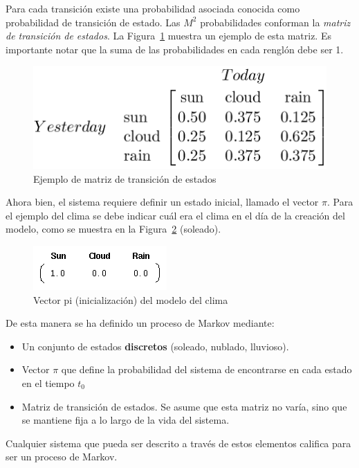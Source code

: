 \documentclass{article}
\begin{document}
Para cada transición existe una probabilidad asociada conocida como probabilidad de transición de estado.
Las $M^2$ probabilidades conforman la \emph{matriz de transición de estados}.
La Figura~\ref{fig:matriz-transicion-clima} muestra un ejemplo de esta matriz.
Es importante notar que la suma de las probabilidades en cada renglón debe ser 1.
\begin{figure}[h]
	\centering
	\includegraphics[scale=0.6]{resources/images/weather-matrix}
	\caption{Ejemplo de matriz de transición de estados}
	\label{fig:matriz-transicion-clima}
\end{figure}

Ahora bien, el sistema requiere definir un estado inicial, llamado el vector $\pi$.
Para el ejemplo del clima se debe indicar cuál era el clima en el día de la creación del modelo, como se muestra en la Figura~\ref{fig:vector-pi} (soleado).
\begin{figure}[tb]
	\centering
	\includegraphics[]{resources/images/pi-vector}
	\caption{Vector pi (inicialización) del modelo del clima}
	\label{fig:vector-pi}
\end{figure}

De esta manera se ha definido un proceso de Markov mediante:
\begin{itemize}
	\item Un conjunto de estados \textbf{discretos} (soleado, nublado, lluvioso).
	\item Vector $\pi$ que define la probabilidad del sistema de encontrarse en cada estado en el tiempo $t_0$
	\item Matriz de transición de estados.
	Se asume que esta matriz no varía, sino que se mantiene fija a lo largo de la vida del sistema.
\end{itemize}

Cualquier sistema que pueda ser descrito a través de estos elementos califica para ser un proceso de Markov.
\end{document}
